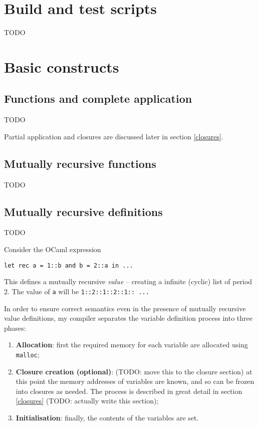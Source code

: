\documentclass[12pt,a4paper,twoside,openright]{report}
\begin{document}
\section{Build and test scripts}

TODO


\section{Basic constructs}

\subsection{Functions and complete application}\label{functions}

TODO

Partial application and closures are discussed later in section \ref{closures}.

\subsection{Mutually recursive functions}\label{mutually-recursive-functions}

TODO

\subsection{Mutually recursive definitions}\label{mutually-recursive-values}

TODO

Consider the OCaml expression

\begin{lstlisting}
let rec a = 1::b and b = 2::a in ...
\end{lstlisting}

This defines a mutually recursive \textit{value} -- creating a infinite
(cyclic) list of period 2. The value of \lstinline!a! will be
\lstinline!1::2::1::2::1:: ...!

In order to ensure correct semantics even in the presence of mutually recursive
value definitions, my compiler separates the variable definition process into
three phases:

\begin{enumerate}
	\item \textbf{Allocation}: first the required memory for each variable are
		allocated using \lstinline!malloc!;
	\item \textbf{Closure creation (optional)}: (TODO: move this to the closure section)  at this point the memory
		addresses of variables are known, and so can be frozen into closures as
		needed. The process is described in great detail in section \ref{closures}
		(TODO: actually write this section);
	\item \textbf{Initialisation}: finally, the contents of the variables are
		set.
\end{enumerate}
\end{document}
